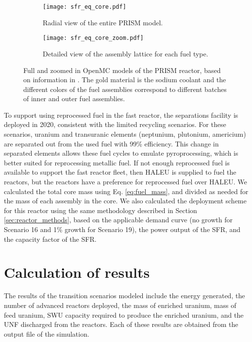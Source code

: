 \begin{figure}[h!]
    \centering
    \begin{subfigure}[b]{0.48\textwidth}
        \centering
        \texttt{[image: sfr\_eq\_core.pdf]}
        \caption{Radial view of the entire PRISM model.}
        \label{fig:prism_lattice}
    \end{subfigure}
    \hfill
    \begin{subfigure}[b]{0.48\textwidth}
        \centering
        \texttt{[image: sfr\_eq\_core\_zoom.pdf]}
        \caption{Detailed view of the assembly lattice for each 
        fuel type.}
        \label{fig:prism_lattice_zoom}
    \end{subfigure}
    \hfill            
    \caption{Full and zoomed in OpenMC models of the PRISM reactor, based 
    on information in \protect\cite{triplett_prism:_2012,fichtlscherer_assessing_2019}. 
    The gold material is the sodium coolant and the different 
    colors of the fuel assemblies correspond to different batches 
    of inner and outer fuel assemblies. }
    \label{fig:prism_model}
\end{figure}

To support using reprocessed fuel in the fast reactor, 
the separations facility is deployed in 2020, consistent with the 
limited recycling scenarios. For these scenarios, uranium and 
transuranic elements (neptunium, plutonium, americium) are separated 
out from 
the used fuel with 99\% efficiency. This change in separated elements 
allows these fuel cycles to emulate pyroprocessing, which is better suited 
for reprocessing metallic fuel.
If not enough reprocessed fuel is 
available to support the fast reactor fleet, then \gls{HALEU} is supplied
to fuel the reactors, but the reactors have a preference for reprocessed 
fuel over \gls{HALEU}. We calculated the total core mass using Eq. 
\ref{eq:fuel_mass},
and divided as needed for the mass of each assembly in the core. 
We also calculated the deployment scheme for this reactor using the 
same methodology described in Section \ref{sec:reactor_methods}, based on 
the applicable demand curve (no growth for Scenario 16 and 1\% growth 
for Scenario 19), the power output of the \gls{SFR}, and the capacity 
factor of the \gls{SFR}.

\section{Calculation of results} \label{sec:results_calc}
The results of the transition scenarios modeled include the energy generated, 
the number of advanced reactors deployed, the mass of enriched uranium, 
mass of feed uranium, \gls{SWU} capacity required to produce the enriched 
uranium, and the \gls{UNF} discharged from the reactors. Each of these results 
are obtained from the \Cyclus output file of the simulation. 

